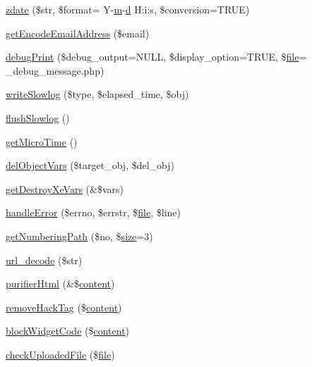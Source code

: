 \begin{DoxyCompactItemize}
\hyperlink{func_8inc_8php_acccf91c81ea5145f4704bdd53421917b}{zdate} (\$str, \$format= \textquotesingle{}Y-\/\hyperlink{jqplot_8barRenderer_8min_8js_a10e752a52784980deba83e0ae1cb7cf1}{m}-\/\hyperlink{xpresseditor_8min_8js_aa27188e30a5d2270a230edf44af69623}{d} H\+:i\+:s\textquotesingle{}, \$conversion=T\+R\+UE)
\item 
\hyperlink{func_8inc_8php_a3ec2d6f22b5d041d959d1c56967b13ce}{get\+Encode\+Email\+Address} (\$email)
\item 
\hyperlink{func_8inc_8php_a84792ec82f804a0b3b60b75bb803ebd5}{debug\+Print} (\$debug\+\_\+output=N\+U\+LL, \$display\+\_\+option=T\+R\+UE, \$\hyperlink{classfile}{file}= \textquotesingle{}\+\_\+debug\+\_\+message.\+php\textquotesingle{})
\item 
\hyperlink{func_8inc_8php_ad04b6facc446291dbbb292553250a4a6}{write\+Slowlog} (\$type, \$elapsed\+\_\+time, \$obj)
\item 
\hyperlink{func_8inc_8php_aafb6a81a912bf5b857fdc1e8528bc853}{flush\+Slowlog} ()
\item 
\hyperlink{func_8inc_8php_a83ff2cccfdfaf38ba29c8c6d04586deb}{get\+Micro\+Time} ()
\item 
\hyperlink{func_8inc_8php_a9ee9f577ae4c2fe0ee8565ba3dd64adc}{del\+Object\+Vars} (\$target\+\_\+obj, \$del\+\_\+obj)
\item 
\hyperlink{func_8inc_8php_a563d33afe37e2b440a2f4500f58eeb64}{get\+Destroy\+Xe\+Vars} (\&\$vars)
\item 
\hyperlink{func_8inc_8php_a4d13a097a6f6c56eadda408e9af13497}{handle\+Error} (\$errno, \$errstr, \$\hyperlink{classfile}{file}, \$line)
\item 
\hyperlink{func_8inc_8php_ae1a0ad24dbf34de227ffd2eb0d1f8da3}{get\+Numbering\+Path} (\$no, \$\hyperlink{jquery-1_8x_8js_afa6806c6ee5e63d5177f1dcc082ba6bc}{size}=3)
\item 
\hyperlink{func_8inc_8php_a02ee51ef0a2362e75837547700dc4f84}{url\+\_\+decode} (\$str)
\item 
\hyperlink{func_8inc_8php_af8504615daee340af724f099cc69662f}{purifier\+Html} (\&\$\hyperlink{classcontent}{content})
\item 
\hyperlink{func_8inc_8php_abde22c0ee89dfd569abd1e338b3b2cf5}{remove\+Hack\+Tag} (\$\hyperlink{classcontent}{content})
\item 
\hyperlink{func_8inc_8php_a3e4480709a0bb53f6478ae6521cda6f3}{block\+Widget\+Code} (\$\hyperlink{classcontent}{content})
\item 
\hyperlink{func_8inc_8php_a771c122bb7a5b7038f7f751f5e2129b9}{check\+Uploaded\+File} (\$\hyperlink{classfile}{file})

\end{DoxyCompactItemize}
